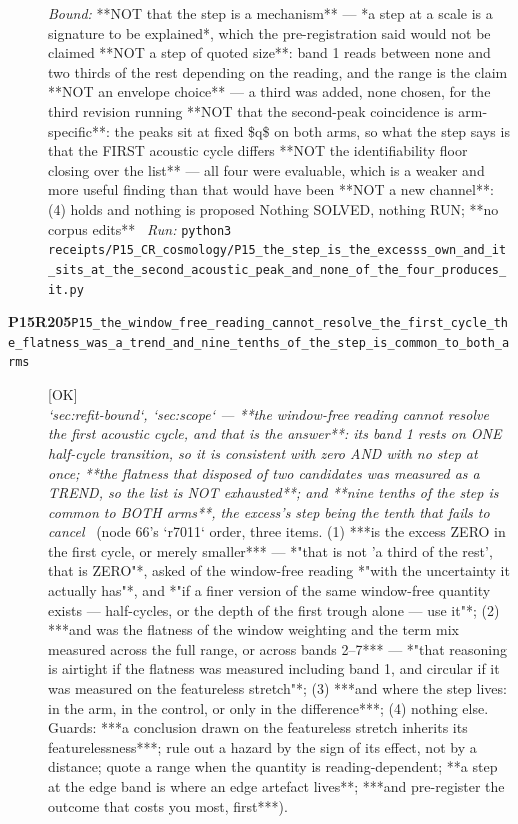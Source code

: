\begin{description}
 \emph{Bound:}  **NOT that the step is a mechanism** --- *a step at a scale is a signature to be explained*, which the pre-registration said would not be claimed  **NOT a step of quoted size**: band 1 reads between none and two thirds of the rest depending on the reading, and the range is the claim  **NOT an envelope choice** --- a third was added, none chosen, for the third revision running  **NOT that the second-peak coincidence is arm-specific**: the peaks sit at fixed \$q\$ on both arms, so what the step says is that the FIRST acoustic cycle differs  **NOT the identifiability floor closing over the list** --- all four were evaluable, which is a weaker and more useful finding than that would have been  **NOT a new channel**: (4) holds and nothing is proposed  Nothing SOLVED, nothing RUN; **no corpus edits**
\ \emph{Run:} \texttt{python3 receipts/P15\_CR\_cosmology/P15\_the\_step\_is\_the\_excesss\_own\_and\_it\_sits\_at\_the\_second\_acoustic\_peak\_and\_none\_of\_the\_four\_produces\_it.py}
\item[\rcptlabel{P15_the_window_free_reading_cannot_resolve_the_first_cycle_the_flatness_was_a_trend_and_nine_tenths_of_the_step_is_common_to_both_arms}{P15R205}\textbf{P15R205}\quad\texttt{P15\_the\_window\_free\_reading\_cannot\_resolve\_the\_first\_cycle\_the\_flatness\_was\_a\_trend\_and\_nine\_tenths\_of\_the\_step\_is\_common\_to\_both\_arms}]\hfill\textsf{[OK]}\\
\textit{`sec:refit-bound`, `sec:scope` --- **the window-free reading cannot resolve the first acoustic cycle, and that is the answer**: its band 1 rests on ONE half-cycle transition, so it is consistent with zero AND with no step at once; **the flatness that disposed of two candidates was measured as a TREND, so the list is NOT exhausted**; and **nine tenths of the step is common to BOTH arms**, the excess's step being the tenth that fails to cancel} \ (node 66's `r7011` order, three items. (1) ***is the excess ZERO in the first cycle, or merely smaller*** --- *"that is not 'a third of the rest', that is ZERO"*, asked of the window-free reading *"with the uncertainty it actually has"*, and *"if a finer version of the same window-free quantity exists --- half-cycles, or the depth of the first trough alone --- use it"*; (2) ***and was the flatness of the window weighting and the term mix measured across the full range, or across bands 2--7*** --- *"that reasoning is airtight if the flatness was measured including band 1, and circular if it was measured on the featureless stretch"*; (3) ***and where the step lives: in the arm, in the control, or only in the difference***; (4) nothing else.  Guards: ***a conclusion drawn on the featureless stretch inherits its featurelessness***; rule out a hazard by the sign of its effect, not by a distance; quote a range when the quantity is reading-dependent; **a step at the edge band is where an edge artefact lives**; ***and pre-register the outcome that costs you most, first***). 

\end{description}
